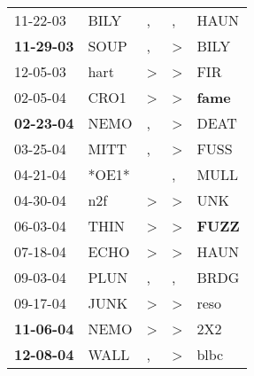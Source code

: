 \begin{supertabular}{p{0.07\textwidth}p{0.06\textwidth}p{0.02\textwidth}p{0.02\textwidth}p{0.06\textwidth}}
          11-22-03\textsuperscript{} &  BILY\textsuperscript{} &                , &             , &           HAUN\textsuperscript{} \\
 \textbf{11-29-03\textsuperscript{}} &  SOUP\textsuperscript{} &                , &  \textgreater &           BILY\textsuperscript{} \\
          12-05-03\textsuperscript{} &  hart\textsuperscript{} &     \textgreater &  \textgreater &            FIR\textsuperscript{} \\
          02-05-04\textsuperscript{} &  CRO1\textsuperscript{} &     \textgreater &  \textgreater &  \textbf{fame\textsuperscript{}} \\
 \textbf{02-23-04\textsuperscript{}} &  NEMO\textsuperscript{} &                , &  \textgreater &           DEAT\textsuperscript{} \\
          03-25-04\textsuperscript{} &  MITT\textsuperscript{} &                , &  \textgreater &           FUSS\textsuperscript{} \\
          04-21-04\textsuperscript{} &                   *OE1* &                  &             , &           MULL\textsuperscript{} \\
          04-30-04\textsuperscript{} &   n2f\textsuperscript{} &     \textgreater &  \textgreater &            UNK\textsuperscript{} \\
          06-03-04\textsuperscript{} &  THIN\textsuperscript{} &     \textgreater &  \textgreater &  \textbf{FUZZ\textsuperscript{}} \\
          07-18-04\textsuperscript{} &  ECHO\textsuperscript{} &     \textgreater &  \textgreater &           HAUN\textsuperscript{} \\
          09-03-04\textsuperscript{} &  PLUN\textsuperscript{} &                , &             , &           BRDG\textsuperscript{} \\
          09-17-04\textsuperscript{} &  JUNK\textsuperscript{} &     \textgreater &  \textgreater &           reso\textsuperscript{} \\
 \textbf{11-06-04\textsuperscript{}} &  NEMO\textsuperscript{} &     \textgreater &  \textgreater &            2X2\textsuperscript{} \\
 \textbf{12-08-04\textsuperscript{}} &  WALL\textsuperscript{} &                , &  \textgreater &           blbc\textsuperscript{} \\

\end{supertabular}
